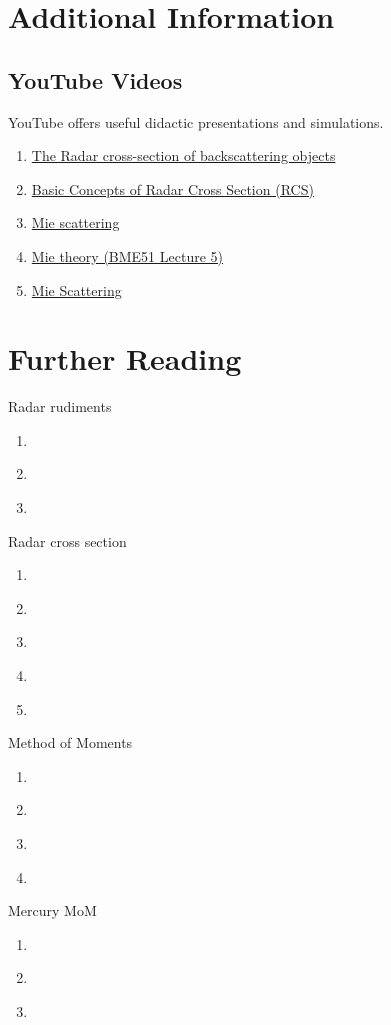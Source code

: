 % 

\section{Additional Information}

\subsection{YouTube Videos}
YouTube offers useful didactic presentations and simulations.
\begin{enumerate}
	\item \href{https://www.youtube.com/watch?v=ujyoJSzwmQw}{The Radar cross-section of backscattering objects}
	\item \href{https://www.youtube.com/watch?v=0g5x4pXBid8}{Basic Concepts of Radar Cross Section (RCS)}
	\item \href{https://www.youtube.com/watch?v=mM-QDN68ebc}{Mie scattering}
	\item \href{https://www.youtube.com/watch?v=ayI6W6-ypUM&list=PLzD7pNQo-MGzkBnp1HVTGXaIQzWvkJ0M8}{Mie theory (BME51 Lecture 5)}
	\item \href{https://www.youtube.com/shorts/ggMoo8wH1_o}{Mie Scattering}
\end{enumerate}

\section{Further Reading}
Radar rudiments
\begin{enumerate}
	\item \cite{peebles2007radar}
	\item \cite{Handbook}
	\item \cite{kolosov1987}
\end{enumerate}
Radar cross section
\begin{enumerate}
	\item \cite{yuan2009efficient}
	\item \cite{fuhs1982radar}
	\item \cite{knott2004radar}
	\item \cite{crispin2013methods}
	\item \cite{madheswaran2012estimation}
\end{enumerate}
Method of Moments
\begin{enumerate}
	\item \cite{harrington1987method}
	\item \cite{gibson2021method}
	\item \cite{lu2003comparison}
	\item \cite{yuan2009efficient}
\end{enumerate}
Mercury MoM
\begin{enumerate}
	\item \cite{Topa-2020-07-07}
	\item \cite{lu2003comparison}
	\item \cite{yuan2009efficient}
\end{enumerate}

\endinput  %